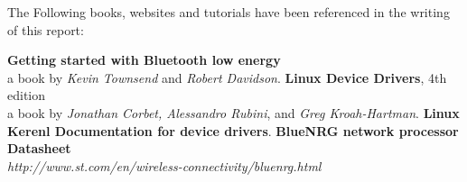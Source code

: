 The Following books, websites and tutorials have been referenced in the writing of this report:
\begin{thebibliography}{9}
	\textbf{Getting started with Bluetooth low energy}\\
		a book by \textit{Kevin Townsend} and \textit{Robert Davidson}.
	\textbf{Linux Device Drivers}, 4th edition\\
		a book by \textit{Jonathan Corbet, Alessandro Rubini}, and \textit{Greg Kroah-Hartman}.
	\textbf{Linux Kerenl Documentation for device drivers}.
	\textbf{BlueNRG network processor Datasheet}\\
		\textit{http://www.st.com/en/wireless-connectivity/bluenrg.html}
\end{thebibliography}
